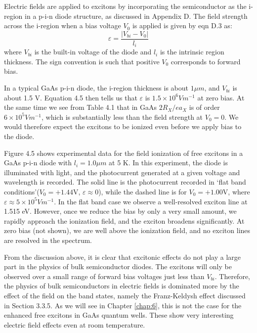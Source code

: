 \documentclass[12pt]{book}
\begin{document}
Electric fields are applied to excitons by incorporating the semiconductor as the i-region in a p-i-n diode structure, as discussed in Appendix D. The field strength across the i-region when a bias voltage $V_0$ is applied is given by eqn D.3 as:
\begin{equation}\label{equa:4.5}
  \varepsilon=\frac{|V_{bi}-V_0|}{l_i}
\end{equation}
where $V_{bi}$ is the built-in voltage of the diode and $l_i$ is the intrinsic region thickness. The sign convention is such that positive $V_0$ corresponds to forward bias.

In a typical GaAs p-i-n diode, the i-region thickness is about $1 \mu m$, and $V_{bi}$ is about 1.5 V. Equation 4.5 then tells us that $\varepsilon$ is $1.5\times 10^6 V m^{-1}$ at zero bias. At the same time we see from Table 4.1 that in GaAs $2R_X/ ea_X$ is of order $6\times 10^5 Vm^{-1}$, which is substantially less than the field strength at $V_0 = 0$. We would therefore expect the excitons to be ionized even before we apply
bias to the diode.

Figure 4.5 shows experimental data for the field ionization of free excitons in a GaAs p-i-n diode with $l_i = 1.0\mu m$ at 5 K. In this experiment, the diode is illuminated with light, and the photocurrent generated at a given voltage and wavelength is recorded. The solid line is the photocurrent recorded in \lq flat band conditions\rq ($V_0 = + 1.44\mathrm{V}$, $\varepsilon\approx0$), while the dashed line is for $V_0 = + 1.00 \mathrm{V}$, where $\varepsilon\approx 5 \times 10^5 V m^{-1}$. In the flat band case we observe a well-resolved exciton line at 1.515 eV. However, once we reduce the bias by only a very small amount, we rapidly approach the ionization field, and the exciton broadens significantly. At zero bias (not shown), we are well above the ionization field, and no exciton lines are resolved in the spectrum.

From the discussion above, it is clear that excitonic effects do not play a large part in the physics of bulk semiconductor diodes. The excitons will only be observed over a small range of forward bias voltages just less than $V_{bi}$. Therefore, the physics of bulk semiconductors in electric fields is dominated more by the effect of the field on the band states, namely the Franz-Keldysh effect discussed in Section 3.3.5. As we will see in Chapter \ref{chap:6}, this is not the case for the enhanced free excitons in GaAs quantum wells. These show very interesting electric field effects even at room temperature.
\end{document}
